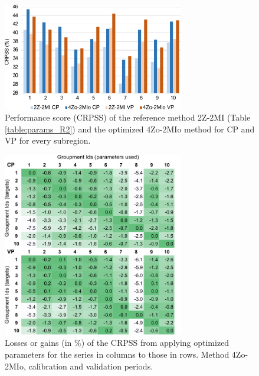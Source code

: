 \documentclass[review]{elsarticle}
\providecommand{\DIFaddtex}[1]{{\protect\color{blue}\uwave{#1}}} %
\providecommand{\DIFaddFL}[1]{\DIFadd{#1}} %
\providecommand{\DIFaddbeginFL}{} %
\providecommand{\DIFaddendFL}{} %
\providecommand{\DIFdelbeginFL}{} %
\providecommand{\DIFdelendFL}{} %
\providecommand{\DIFadd}[1]{\texorpdfstring{\DIFaddtex{#1}}{#1}} %
\begin{document}
\begin{figure}[t]
	\DIFdelbeginFL %
\DIFdelendFL \DIFaddbeginFL \centerline{\includegraphics[width=7.9cm]{fig07.pdf}}
	\DIFaddendFL \caption{Performance score (CRPSS) of the reference method 2Z-2MI (Table \ref{table:params_R2}) and the optimized 4Zo-2MIo method for \DIFaddbeginFL \DIFaddFL{the }\DIFaddendFL CP and VP for every subregion.}
	\label{fig:figure_crpss_4Zo-2HIo}
\end{figure}

\begin{figure}[t]
	\DIFdelbeginFL %
\DIFdelendFL \DIFaddbeginFL \centerline{\includegraphics[width=7.9cm]{fig08.pdf}}
	\DIFaddendFL \caption{Losses or gains (in \%) of the CRPSS from applying optimized parameters for the series in columns to those in rows. Method 4Zo-2MIo, calibration and validation periods.}
	\label{fig:crossing_4Zo-2MIo}
\end{figure}
\end{document}
